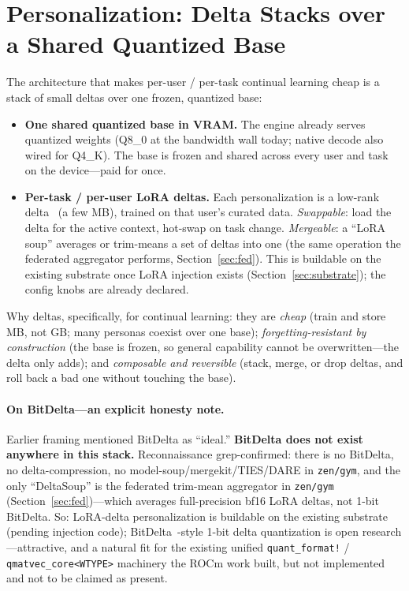 \documentclass[11pt]{article}
\begin{document}
\section{Personalization: Delta Stacks over a Shared Quantized Base}
\label{sec:delta}

The architecture that makes per-user / per-task continual learning cheap is a stack of small deltas over one frozen, quantized base:
\begin{itemize}
    \item \textbf{One shared quantized base in VRAM.} The engine already serves quantized weights (Q8\_0 at the bandwidth wall today; native decode also wired for Q4\_K). The base is frozen and shared across every user and task on the device---paid for once.
    \item \textbf{Per-task / per-user LoRA deltas.} Each personalization is a low-rank delta~\cite{lora} (a few MB), trained on that user's curated data. \emph{Swappable}: load the delta for the active context, hot-swap on task change. \emph{Mergeable}: a ``LoRA soup'' averages or trim-means a set of deltas into one (the same operation the federated aggregator performs, Section~\ref{sec:fed}). This is buildable on the existing substrate once LoRA injection exists (Section~\ref{sec:substrate}); the config knobs are already declared.
\end{itemize}

Why deltas, specifically, for continual learning: they are \emph{cheap} (train and store MB, not GB; many personas coexist over one base); \emph{forgetting-resistant by construction} (the base is frozen, so general capability cannot be overwritten---the delta only adds); and \emph{composable and reversible} (stack, merge, or drop deltas, and roll back a bad one without touching the base).

\paragraph{On BitDelta---an explicit honesty note.}
Earlier framing mentioned BitDelta as ``ideal.'' \textbf{BitDelta does not exist anywhere in this stack.} Reconnaissance grep-confirmed: there is no BitDelta, no delta-compression, no model-soup/mergekit/TIES/DARE in \texttt{zen/gym}, and the only ``DeltaSoup'' is the federated trim-mean aggregator in \texttt{zen/gym} (Section~\ref{sec:fed})---which averages full-precision bf16 LoRA deltas, not 1-bit BitDelta. So: LoRA-delta personalization is buildable on the existing substrate (pending injection code); BitDelta~\cite{bitdelta}-style 1-bit delta quantization is open research---attractive, and a natural fit for the existing unified \texttt{quant\_format!} / \texttt{qmatvec\_core<WTYPE>} machinery the ROCm work built, but not implemented and not to be claimed as present.
\end{document}
